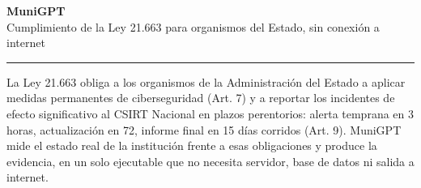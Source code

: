 \documentclass[10pt,a4paper]{article}
\newcommand{\barra}{\textcolor{azul}{\rule{\linewidth}{1.2pt}}}
\begin{document}
{\color{azul}\Huge\bfseries MuniGPT}\\[2pt]
{\color{gris}\large Cumplimiento de la Ley 21.663 para organismos del Estado, sin conexión a
internet}

\vspace{4pt}
\barra

\vspace{6pt}

La Ley 21.663 obliga a los organismos de la Administración del Estado a aplicar medidas
permanentes de ciberseguridad (Art. 7\textdegree) y a reportar los incidentes de efecto
significativo al CSIRT Nacional en plazos perentorios: alerta temprana en 3 horas,
actualización en 72, informe final en 15 días corridos (Art. 9\textdegree). MuniGPT mide
el estado real de la institución frente a esas obligaciones y produce la evidencia, en un
solo ejecutable que no necesita servidor, base de datos ni salida a internet.
\end{document}
